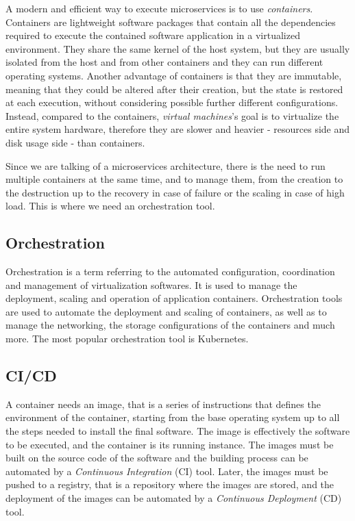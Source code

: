 A modern and efficient way to execute microservices is to use \textit{containers}. \\
Containers are lightweight software packages that contain all the dependencies required to execute the contained software application in a virtualized environment. They share the same kernel of the host system, but they are usually isolated from the host and from other containers and they can run different operating systems. Another advantage of containers is that they are immutable, meaning that they could be altered after their creation, but the state is restored at each execution, without considering possible further different configurations.\\
Instead, compared to the containers, \textit{virtual machines}'s goal is to virtualize the entire system hardware, therefore they are slower and heavier - resources side and disk usage side - than containers.

Since we are talking of a microservices architecture, there is the need to run multiple containers at the same time, and to manage them, from the creation to the destruction up to the recovery in case of failure or the scaling in case of high load. This is where we need an orchestration tool.

\subsection{Orchestration}

Orchestration is a term referring to the automated configuration, coordination and management of virtualization softwares. It is used to manage the deployment, scaling and operation of application containers. Orchestration tools are used to automate the deployment and scaling of containers, as well as to manage the networking, the storage configurations of the containers and much more. The most popular orchestration tool is Kubernetes.

\subsection{CI/CD}

A container needs an image, that is a series of instructions that defines the environment of the container, starting from the base operating system up to all the steps needed to install the final software. The image is effectively the software to be executed, and the container is its running instance. The images must be built on the source code of the software and the building process can be automated by a \textit{Continuous Integration} (CI) tool. Later, the images must be pushed to a registry, that is a repository where the images are stored, and the deployment of the images can be automated by a \textit{Continuous Deployment} (CD) tool.

